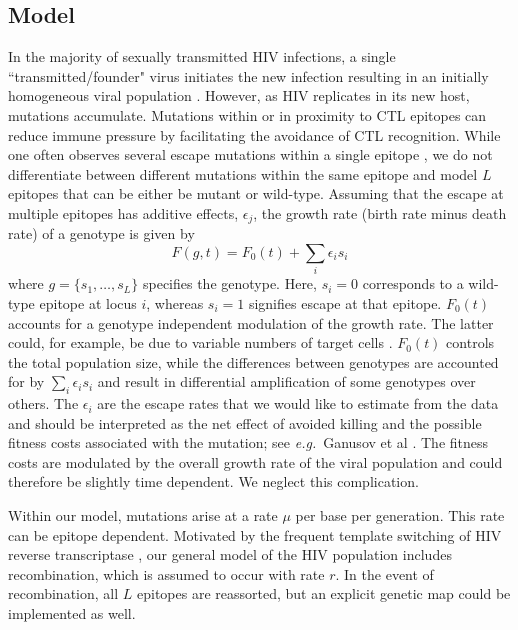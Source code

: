 \documentclass{frontiers}
\newcommand{\gt}{g}
\newcommand{\fcoeff}{\epsilon}
\newcommand{\locus}{s}
\begin{document}
\subsection{Model} In the majority of sexually transmitted HIV infections, a single 
``transmitted/founder" virus initiates the new infection
resulting in an initially homogeneous viral population 
\citep{SalazarGonzalez:2009p35091,keele_identification_2008}.
However, as HIV replicates in its new host, mutations
accumulate. Mutations within or in proximity to CTL epitopes can reduce 
immune pressure by facilitating the avoidance of CTL recognition. 
While one often observes several escape mutations within a single
epitope \citep{Fischer:2010p40314,henn_whole_2012}, we do not differentiate between different mutations
within the same epitope and model $L$ epitopes that can be either be
mutant or wild-type.
Assuming that the escape at multiple epitopes has additive effects,
$\fcoeff_j$, the growth rate (birth rate minus death rate) of a genotype is given by
\begin{equation}
\label{eq:growth_rate}
F(\gt,t) = F_0(t) + \sum_i \fcoeff_i \locus_i
\end{equation}
where $\gt = \{\locus_1, \ldots, \locus_L\}$ specifies
the genotype. Here, $\locus_i=0$ corresponds to a wild-type epitope at locus $i$, 
whereas $\locus_i=1$ signifies escape at that epitope. $F_0(t)$ accounts
for a genotype independent modulation of 
the growth rate. The latter could, for example, be due to variable numbers of
target cells \citep{petravic_cd4+_2008,ganusov_estimating_2006}. $F_0(t)$ controls the total population size, while the differences
between genotypes are accounted for by $\sum_i \fcoeff_i \locus_i$ and result in
differential amplification of some genotypes over others. The
$\fcoeff_i$ are the escape rates that we would like to estimate from the data and should
be interpreted as the net effect of avoided killing and the possible fitness costs associated
with the mutation; see \textit{e.g.}~Ganusov et al
\cite{ganusov_mathematical_2013}. The fitness costs are modulated 
by the overall growth rate of the viral population and could therefore
be slightly time dependent. We neglect this complication.

Within our model, mutations arise at a rate
$\mu$ per base per generation. This rate can be epitope dependent. 
Motivated by the frequent template switching of HIV reverse transcriptase 
\citep{Levy:2004p23309}, our general
model of the HIV population includes recombination, which is assumed to occur
with rate $r$. In the event of recombination, all $L$ epitopes are
reassorted, but an explicit genetic map could be implemented as well.
\end{document}

